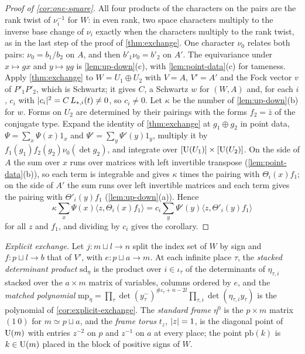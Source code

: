 \begin{proof}[Proof of \cref{cor:one-square}]
All four products of the characters on the pairs are the rank twist of $\nu_i^{-1}$ for $W$: in even rank, two space characters multiply to the inverse base change of $\nu_i$ exactly when the characters
multiply to the rank twist, as in the last step of the proof of \cref{thm:exchange}. One character $\nu_0$ relates both pairs: $\nu_0=b_1/b_2$ on $A$, and then $b'_1\nu_0=b'_2$ on $A'$. The equivariance under $x\mapsto gx$ and $y\mapsto yg$ is \cref{lem:up-down}(c), with
\cref{lem:point-data}(c) for tameness. Apply \cref{thm:exchange} to $W=U_1\oplus U_2$ with $V=A$, $V'=A'$ and the Fock vector $v$ of $P'_1P'_2$, which is Schwartz; it gives $C$, a Schwartz $w$ for $(W,A)$ and, for
each $i$, $c_i$ with $\lvert c_i\rvert^2=C\,L_{*,i}(t)\ne0$, so $c_i\ne0$. Let $\kappa$ be the number of \cref{lem:up-down}(b) for $w$. Forms on $U_2$ are determined by their pairings with the forms $f_2=\bar z$ of the conjugate
type. Expand the identity of \cref{thm:exchange} at $g_1\oplus g_2$ in point data, $\Psi=\sum_x\Psi(x)1_x$ and $\Psi'=\sum_y\Psi'(y)1_y$, multiply it by $f_1(g_1)f_2(g_2)\nu_0(\det g_2)$, and integrate over $[\operatorname{U}(U_1)]\times[\operatorname{U}(U_2)]$.
On the side of $A$ the sum over $x$ runs over matrices with left invertible transpose (\cref{lem:point-data}(b)), so each term is integrable and gives $\kappa$ times the pairing with $\Theta_i(x)f_1$; on the side of
$A'$ the sum runs over left invertible matrices and each term gives the pairing with $\Theta'_i(y)f_1$ (\cref{lem:up-down}(a)). Hence
\[
  \kappa\sum_x\Psi(x)\langle z,\Theta_i(x)f_1\rangle=c_i\sum_y\Psi'(y)\langle z,\Theta'_i(y)f_1\rangle
\]
for all $z$ and $f_1$, and dividing by $c_i$ gives the corollary.
\end{proof}

\emph{Explicit exchange.} Let $j\colon m\sqcup l\to n$ split the index set of $W$ by sign and $f\colon p\sqcup l\to b$ that of $V'$, with $e\colon p\sqcup a\to m$. At each infinite place $\tau$, the \emph{stacked
determinant product} $\mathrm{sd}_\eta$ is the product over $i\in\iota_\tau$ of the determinants of $\eta_{\tau,i}$ stacked over the $a\times m$ matrix of variables, columns ordered by $e$, and the \emph{matched
polynomial} $\mathrm{mp}_\eta=\prod_\tau\det(y^-_\tau)^{\#\iota_\tau+n-2l}\prod_{\tau,i}\det(\eta_{\tau,i}y_\tau)$ is the polynomial of \cref{cor:explicit-exchange}. The \emph{standard frame} $\eta^0$ is the $p\times m$ matrix
$(1\ 0)$ for $m\simeq p\sqcup a$, and the \emph{frame torus} $t_z$, $\lvert z\rvert=1$, is the diagonal point of $\operatorname{U}(m)$ with entries $z^{-2}$ on $p$ and $z^{-1}$ on $a$ at every place; the point $\mathrm{pb}(k)$ is $k\in\operatorname{U}(m)$
placed in the block of positive signs of $W$.

